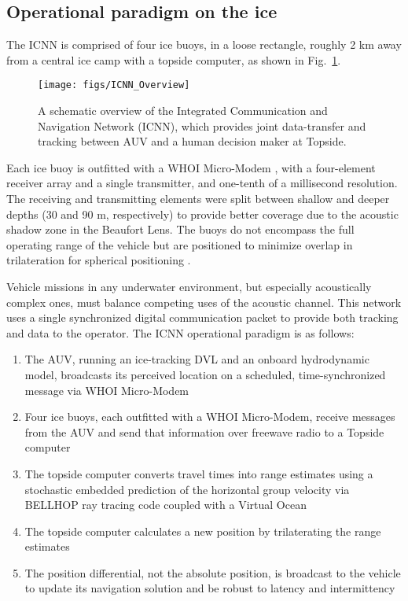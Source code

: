 \subsection{Operational paradigm on the ice}

The ICNN is comprised of four ice buoys, in a loose rectangle, roughly 2 km away from a central ice camp with a topside computer, as shown in Fig.~\ref{fig:icnnOverview}.

\begin{figure}[h!]
	\centering
	\texttt{[image: figs/ICNN\_Overview]}
	\caption{A schematic overview of the Integrated Communication and Navigation Network (ICNN), which provides joint data-transfer and tracking between AUV and a human decision maker at Topside.}
	\label{fig:icnnOverview}
\end{figure}

Each ice buoy is outfitted with a WHOI Micro-Modem \citep{singh_underwater_2006}, with a four-element receiver array and a single transmitter, and one-tenth of a millisecond resolution.
The receiving and transmitting elements were split between shallow and deeper depths (30 and 90 m, respectively) to provide better coverage due to the acoustic shadow zone in the Beaufort Lens.
The buoys do not encompass the full operating range of the vehicle but are positioned to minimize overlap in trilateration for spherical positioning \citep{deffenbaugh_relationship_1996}.

Vehicle missions in any underwater environment, but especially acoustically complex ones, must balance competing uses of the acoustic channel.
This network uses a single synchronized digital communication packet to provide both tracking and data to the operator.
The ICNN operational paradigm is as follows:
\begin{enumerate}
\item The AUV, running an ice-tracking DVL and an onboard hydrodynamic model, broadcasts its perceived location on a scheduled, time-synchronized message via WHOI Micro-Modem
\item Four ice buoys, each outfitted with a WHOI Micro-Modem, receive messages from the AUV and send that information over freewave radio to a Topside computer
\item The topside computer converts travel times into range estimates using a stochastic embedded prediction of the horizontal group velocity via BELLHOP ray tracing code \citep{porter_bellhop_2011} coupled with a Virtual Ocean \citep{schneider_netsim_2018}
\item The topside computer calculates a new position by trilaterating the range estimates
\item The position differential, not the absolute position, is broadcast to the vehicle to update its navigation solution and be robust to latency and intermittency
\end{enumerate}

